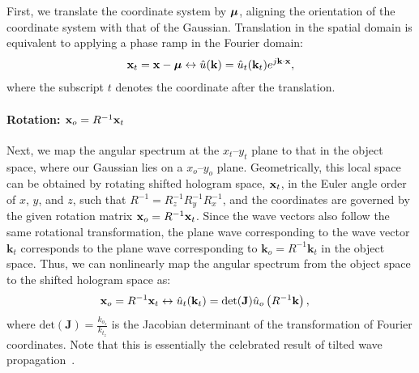First, we translate the coordinate system by ${\bm{\mu}}$, aligning the orientation of the coordinate system with that of the Gaussian. Translation in the spatial domain is equivalent to applying a phase ramp in the Fourier domain: 
\begin{align} 
\mathbf{x}_t = \mathbf{x} - {\bm{\mu}} \leftrightarrow \hat{u} (\mathbf{k}) = \hat{u}_t (\mathbf{k}_t) e^{j\mathbf{k}\cdot\mathbf{x}}, 
\label{eq:translation}
\end{align} 
where the subscript $t$ denotes the coordinate after the translation.

\paragraph{\textbf{Rotation: $\mathbf{x}_o = R^{-1} \mathbf{x}_t$}}
Next, we map the angular spectrum at the $x_t$--$y_t$ plane to that in the object space, where our Gaussian lies on a $x_o$--$y_o$ plane. Geometrically, this local space can be obtained by rotating shifted hologram space, $\mathbf{x}_t$, in the Euler angle order of $x$, $y$, and $z$, such that $R^{-1} = R_z^{-1} R_y^{-1} R_x^{-1}$, and the coordinates are governed by the given rotation matrix $\mathbf{x}_o = R^{-1} \mathbf{x}_t$. Since the wave vectors also follow the same rotational transformation, the plane wave corresponding to the wave vector $\mathbf{k}_t$ corresponds to the plane wave corresponding to $\mathbf{k}_o = R^{-1} \mathbf{k}_t$ in the object space. Thus, we can nonlinearly map the angular spectrum from the object space to the shifted hologram space as: 
\begin{align} 
\mathbf{x}_o = R^{-1} \mathbf{x}_t \leftrightarrow \hat{u}_t (\mathbf{k}_t) &= \textrm{det}( \mathbf{J}) \hat{u}_o\left( R^{-1} \mathbf{k} \right), \label{eq:rotation}
\end{align} 
where $\textrm{det} (\mathbf{J}) = \frac{k_{o_z}}{k_{t_z}}$ is the Jacobian determinant of the transformation of Fourier coordinates. Note that this is essentially the celebrated result of tilted wave propagation~\cite{matsushima2003fast}.

